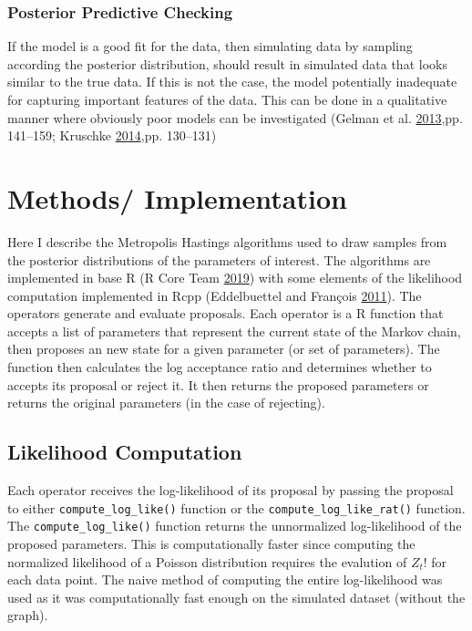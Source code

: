 \documentclass[11pt,a4paper]{article}
\numberwithin{equation}{section}
\begin{document}
\hypertarget{posterior-predictive-checking}{%
\subsubsection{Posterior Predictive
Checking}\label{posterior-predictive-checking}}

If the model is a good fit for the data, then simulating data by
sampling according the posterior distribution, should result in
simulated data that looks similar to the true data. If this is not the
case, the model potentially inadequate for capturing important features
of the data. This can be done in a qualitative manner where obviously
poor models can be investigated (Gelman et al.
\protect\hyperlink{ref-gelman_bayesian_2013}{2013},pp. 141--159;
Kruschke \protect\hyperlink{ref-kruschke_doing_2014}{2014},pp. 130--131)

\hypertarget{methods}{%
\section{Methods/ Implementation}\label{methods}}

Here I describe the Metropolis Hastings algorithms used to draw samples
from the posterior distributions of the parameters of interest. The
algorithms are implemented in base R (R Core Team
\protect\hyperlink{ref-r_core_team_r_2019}{2019}) with some elements of
the likelihood computation implemented in Rcpp (Eddelbuettel and
François \protect\hyperlink{ref-eddelbuettel_rcpp_2011}{2011}). The
operators generate and evaluate proposals. Each operator is a R function
that accepts a list of parameters that represent the current state of
the Markov chain, then proposes an new state for a given parameter (or
set of parameters). The function then calculates the log acceptance
ratio and determines whether to accepts its proposal or reject it. It
then returns the proposed parameters or returns the original parameters
(in the case of rejecting).

\hypertarget{likelihood-computation}{%
\subsection{Likelihood Computation}\label{likelihood-computation}}

Each operator receives the log-likelihood of its proposal by passing the
proposal to either \texttt{compute\_log\_like()} function or the
\texttt{compute\_log\_like\_rat()} function. The
\texttt{compute\_log\_like()} function returns the unnormalized
log-likelihood of the proposed parameters. This is computationally
faster since computing the normalized likelihood of a Poisson
distribution requires the evalution of \(Z_{t}!\) for each data point.
The naive method of computing the entire log-likelihood was used as it
was computationally fast enough on the simulated dataset (without the
graph).
\end{document}
